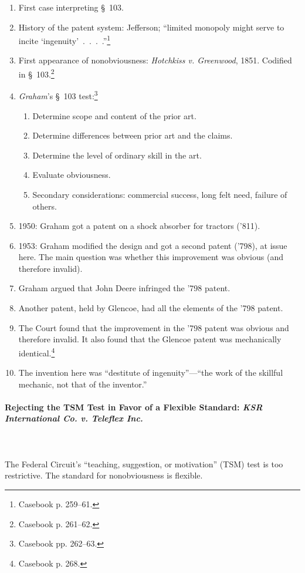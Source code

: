 \begin{enumerate}
    \item First case interpreting \S\ 103.
    \item History of the patent system: Jefferson; \enquote{limited monopoly 
    might serve to incite \enquote{ingenuity}~.~.~.~.}\footnote{Casebook p. 
    259--61.}
    \item First appearance of nonobviousness: \emph{Hotchkiss v. Greenwood}, 
    1851. Codified in \S\ 103.\footnote{Casebook p. 261--62.}
    \item \emph{Graham}'s \S\ 103 test:\footnote{Casebook pp. 262--63.}
    \begin{enumerate}
        \item Determine scope and content of the prior art.
        \item Determine differences between prior art and the claims.
        \item Determine the level of ordinary skill in the art.
        \item Evaluate obviousness.
        \item Secondary considerations: commercial success, long felt need, 
        failure of others.
    \end{enumerate}
    \item 1950: Graham got a patent on a shock absorber for tractors ('811).
    \item 1953: Graham modified the design and got a second patent ('798), at 
    issue here. The main question was whether this improvement was obvious 
    (and therefore invalid).
    \item Graham argued that John Deere infringed the '798 patent.
    \item Another patent, held by Glencoe, had all the elements of the '798 
    patent.
    \item The Court found that the improvement in the '798 patent was obvious 
    and therefore invalid. It also found that the Glencoe patent was 
    mechanically identical.\footnote{Casebook p. 268.}
    \item The invention here was ``destitute of ingenuity''---``the work of 
    the skillful mechanic, not that of the inventor.''
\end{enumerate}

\paragraph{Rejecting the TSM Test in Favor of a Flexible Standard: \emph{KSR 
International Co. v. Teleflex Inc.}}
~\\\\
The Federal Circuit's ``teaching, suggestion, or motivation'' (TSM) test is 
too restrictive. The standard for nonobviousness is flexible.

